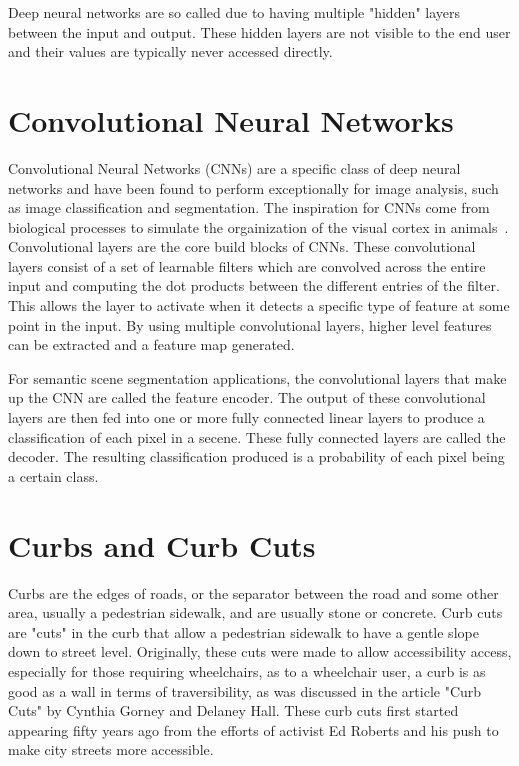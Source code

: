 Deep neural networks are so called due to having multiple "hidden" layers between the input and output.
These hidden layers are not visible to the end user and their values are typically never accessed directly.

\section{Convolutional Neural Networks}\label{section:background-cnn}
Convolutional Neural Networks (CNNs) are a specific class of deep neural networks and have been found to perform exceptionally for image analysis, such as image classification and segmentation.
The inspiration for CNNs come from biological processes to simulate the orgainization of the visual cortex in animals~\cite{cnnbiology}.
Convolutional layers are the core build blocks of CNNs.
These convolutional layers consist of a set of learnable filters which are convolved across the entire input and computing the dot products between the different entries of the filter.
This allows the layer to activate when it detects a specific type of feature at some point in the input.
By using multiple convolutional layers, higher level features can be extracted and a feature map generated.

For semantic scene segmentation applications, the convolutional layers that make up the CNN are called the feature encoder.
The output of these convolutional layers are then fed into one or more fully connected linear layers to produce a classification of each pixel in a secene.
These fully connected layers are called the decoder.
The resulting classification produced is a probability of each pixel being a certain class.

\section{Curbs and Curb Cuts}\label{section:background-curbs}
Curbs are the edges of roads, or the separator between the road and some other area, usually a pedestrian sidewalk, and are usually stone or concrete.
Curb cuts are "cuts" in the curb that allow a pedestrian sidewalk to have a gentle slope down to street level.
Originally, these cuts were made to allow accessibility access, especially for those requiring wheelchairs, as to a wheelchair user, a curb is as good as a wall in terms of traversibility, as was discussed in the article "Curb Cuts" by Cynthia Gorney and Delaney Hall. These curb cuts first started appearing fifty years ago from the efforts of activist Ed Roberts and his push to make city streets more accessible.

